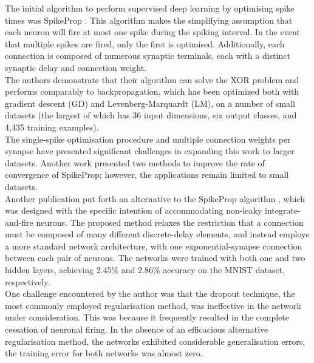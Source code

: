 \noindent The initial algorithm to perform supervised deep learning by optimising spike times was SpikeProp \cite{bohte2002error}. This algorithm makes the simplifying assumption that each neuron will fire at most one spike during the spiking interval. In the event that multiple spikes are fired, only the first is optimised. Additionally, each connection is composed of numerous synaptic terminals, each with a distinct synaptic delay and connection weight. \\

\noindent The authors demonstrate that their algorithm can solve the XOR problem and performs comparably to backpropagation, which has been optimized both with gradient descent (GD) and Levenberg-Marquardt (LM), on a number of small datasets (the largest of which has 36 input dimensions, six output classes, and 4,435 training examples). \\

\noindent The single-spike optimisation procedure and multiple connection weights per synapse have presented significant challenges in expanding this work to larger datasets. Another work \cite{mckennoch2006fast} presented two methods to improve the rate of convergence of SpikeProp; however, the applications remain limited to small datasets. \\

\noindent Another publication put forth an alternative to the SpikeProp algorithm \cite{mostafa2017supervised}, which was designed with the specific intention of accommodating non-leaky integrate-and-fire neurons. The proposed method relaxes the restriction that a connection must be composed of many different discrete-delay elements, and instead employs a more standard network architecture, with one exponential-synapse connection between each pair of neurons. The networks were trained with both one and two hidden layers, achieving 2.45\% and 2.86\% accuracy on the MNIST dataset, respectively. \\

\noindent One challenge encountered by the author was that the dropout technique, the most commonly employed regularisation method, was ineffective in the network under consideration. This was because it frequently resulted in the complete cessation of neuronal firing. In the absence of an efficacious alternative regularisation method, the networks exhibited considerable generalisation errors, the training error for both networks was almost zero.\\

